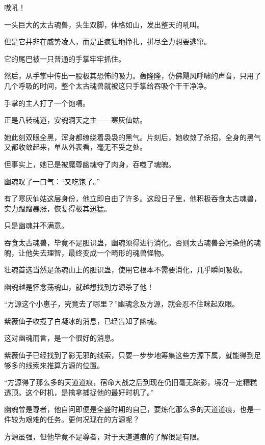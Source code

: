 
\begin{this_body}



嗷吼！

一头巨大的太古魂兽，头生双脚，体格如山，发出整天的吼叫。

但是它并非在威势凌人，而是正疯狂地挣扎，拼尽全力想要逃窜。

它的尾巴被一只普通的手掌牢牢抓住。

然后，从手掌中传出一股极其恐怖的吸力。轰隆隆，仿佛飓风呼啸的声音，只用了几个呼吸的时间，整个太古魂兽就被这只手掌给吞吸个干干净净。

手掌的主人打了一个饱嗝。

正是八转魂道，安魂洞天之主——寒灰仙姑。

她此刻双眼全黑，浑身都缭绕着袅袅的黑气。片刻后，她收敛了杀招，全身的黑气又都收敛起来，单从外表看，毫无不妥之处。

但事实上，她已是被魔尊幽魂夺了肉身，吞噬了魂魄。

幽魂叹了一口气：“又吃饱了。”

有了寒灰仙姑这层身份，他立即自由了许多。这段日子里，他积极吞食太古魂兽，实力蹭蹭暴涨，恢复得极其迅猛。

只是幽魂并不满意。

吞食太古魂兽，毕竟不是胆识蛊，幽魂须得进行消化。否则太古魂兽会污染他的魂魄，让他失去理智，最终变成一个畸形的魂兽怪物。

壮魂首选当然是荡魂山上的胆识蛊，使用它根本不需要消化，几乎瞬间吸收。

幽魂越是怀念荡魂山，就越想找到方源杀了他！

“方源这个小崽子，究竟去了哪里？”幽魂念及方源，就会忍不住眯起双眼。

紫薇仙子收揽了白凝冰的消息，已经告知了幽魂。

这对幽魂而言，是一个很好的消息。

紫薇仙子已经找到了影无邪的线索，只要一步步地筹集这些方源下属，就能得到足够多的线索来推算方源的位置。

“方源得了那么多的天道道痕，宿命大战之后到现在仍旧毫无踪影，境况一定糟糕透顶。这个时机，是擒拿捕捉他的最好时机了。”

幽魂曾是尊者，他自问即便是全盛时期的自己，要炼化那么多的天道道痕，也是一件较为艰难的任务。更何况现在的方源呢？

方源虽强，但他毕竟不是尊者，对于天道道痕的了解很是有限。


\end{this_body}
